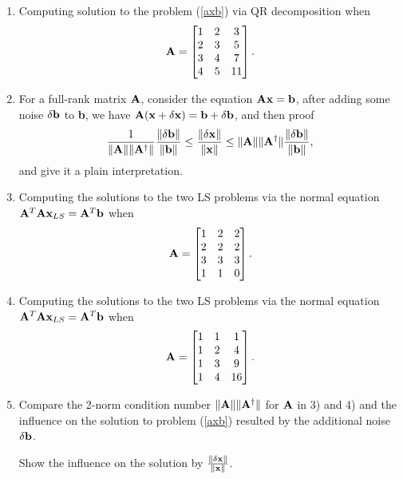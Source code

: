 \documentclass[english,onecolumn]{IEEEtran}
\begin{document}
\begin{enumerate}
    \item Computing solution to the problem (\ref{axb})
    via QR decomposition when \[{\bf A}=
    \begin{bmatrix}
    1 & 2 & 3\\
    2 & 3 & 5\\
    3 & 4 & 7\\
    4 & 5 & 11
    \end{bmatrix}. \]
    
    \item For a full-rank matrix ${\bf A}$, consider the equation ${\bf Ax=b}$, after adding some noise $\delta{\bf b}$ to {\bf b}, we have ${\bf A}({\bf x}+\delta{\bf x}) = {\bf b}+\delta{\bf b}$, 
    and then proof
    $$ \frac{1}{\|{\bf A}\| \|{\bf A}^{\dagger}\|} \frac{\|\delta {\bf b}\|}{\|{\bf b}\|}
    \leq \frac{\|\delta {\bf x}\|}{\|{\bf x}\|} \leq
    \|{\bf A}\| \|{\bf A}^{\dagger}\|\frac{\|\delta {\bf b}\|}{\|{\bf b}\|}, $$
    and give it a plain interpretation.
    
    \item Computing the solutions to the two LS problems via the normal equation $ {\bf A}^T{\bf A}{\bf x}_{LS} = {\bf A}^T {\bf b} $ when \[{\bf A}=\begin{bmatrix}
    1 & 2 & 2\\
    2 & 2 & 2\\
    3 & 3 & 3\\
    1 & 1 & 0
    \end{bmatrix}.  \]
    
    \item Computing the solutions to the two LS problems via the normal equation $ {\bf A}^T{\bf A}{\bf x}_{LS} = {\bf A}^T {\bf b} $ when \[ {\bf A} = \begin{bmatrix}
    1 & 1 & 1\\
    1 & 2 & 4\\
    1 & 3 & 9\\
    1 & 4 & 16
    \end{bmatrix}. \]
    
    \item 
    Compare the 2-norm condition number $\|{\bf A}\|\| {\bf A}^{\dagger
    }\|$ for ${\bf A}$ in 3) and 4) and the influence on the solution to problem (\ref{axb}) 
    resulted by the additional noise $\delta{\bf b}$.
    
     Show the influence on the solution  by $\frac{\|\delta {\bf x}\|}{\|{\bf x}\|}$.
\end{enumerate}
\end{document}
